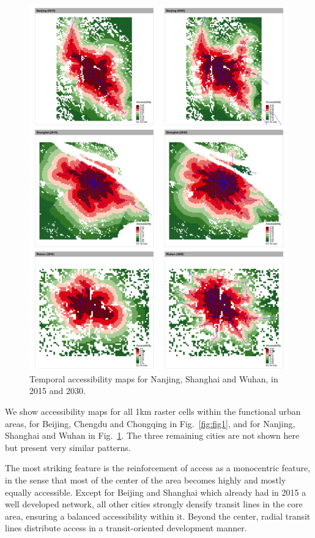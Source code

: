 \documentclass{article}
\begin{document}
\begin{figure}
	\includegraphics[width=\linewidth]{figures/Fig1b.png}
	\caption{Temporal accessibility maps for Nanjing, Shanghai and Wuhan, in 2015 and 2030.\label{fig:fig2}}
\end{figure}

We show accessibility maps for all 1km raster cells within the functional urban areas, for Beijing, Chengdu and Chongqing in Fig.~\ref{fig:fig1}, and for Nanjing, Shanghai and Wuhan in Fig.~\ref{fig:fig2}. The three remaining cities are not shown here but present very similar patterns.

The most striking feature is the reinforcement of access as a monocentric feature, in the sense that most of the center of the area becomes highly and mostly equally accessible. Except for Beijing and Shanghai which already had in 2015 a well developed network, all other cities strongly densify transit lines in the core area, ensuring a balanced accessibility within it. Beyond the center, radial transit lines distribute access in a transit-oriented development manner.
\end{document}
